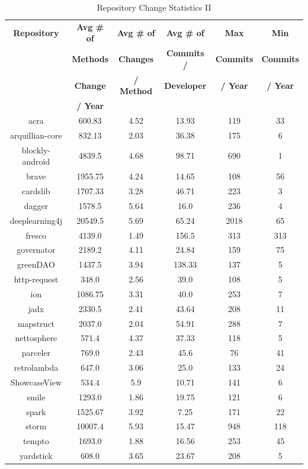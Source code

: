 \begin{table}
\begin{center}
    \begin{tabular}{|c|c|c|c|c|c|}
        \hline
        \textbf{Repository} & \textbf{Avg \# of} & \textbf{Avg \# of} & \textbf{Avg \# of} & \textbf{Max} & \textbf{Min} \\
         & \textbf{Methods} & \textbf{Changes} & \textbf{Commits /} & \textbf{Commits} & \textbf{Commits} \\
         & \textbf{Change} & \textbf{/ Method} & \textbf{Developer} & \textbf{/ Year} & \textbf{/ Year} \\
         & \textbf{/ Year} & & & & \\
        \hline
        acra & 600.83 & 4.52 & 13.93 & 119 & 33 \\
        arquillian-core & 832.13 & 2.03 & 36.38 & 175 & 6 \\
        blockly-android & 4839.5 & 4.68 & 98.71 & 690 & 1 \\
        brave & 1955.75 & 4.24 & 14.65 & 108 & 56 \\
        cardslib & 1707.33 & 3.28 & 46.71 & 223 & 3 \\
        dagger & 1578.5 & 5.64 & 16.0 & 236 & 4 \\
        deeplearning4j & 20549.5 & 5.69 & 65.24 & 2018 & 65 \\
        fresco & 4139.0 & 1.49 & 156.5 & 313 & 313 \\
        governator & 2189.2 & 4.11 & 24.84 & 159 & 75 \\
        greenDAO & 1437.5 & 3.94 & 138.33 & 137 & 5 \\
        http-request & 348.0 & 2.56 & 39.0 & 108 & 5 \\
        ion & 1086.75 & 3.31 & 40.0 & 253 & 7 \\
        jadx & 2330.5 & 2.41 & 43.64 & 208 & 11 \\
        mapstruct & 2037.0 & 2.04 & 54.91 & 288 & 7 \\
        nettosphere & 571.4 & 4.37 & 37.33 & 118 & 5 \\
        parceler & 769.0 & 2.43 & 45.6 & 76 & 41 \\
        retrolambda & 647.0 & 3.06 & 25.0 & 133 & 24 \\
        ShowcaseView & 534.4 & 5.9 & 10.71 & 141 & 6 \\
        smile & 1293.0 & 1.86 & 19.75 & 121 & 6 \\
        spark & 1525.67 & 3.92 & 7.25 & 171 & 22 \\
        storm & 10007.4 & 5.93 & 15.47 & 948 & 118 \\
        tempto & 1693.0 & 1.88 & 16.56 & 253 & 45 \\
        yardstick & 608.0 & 3.65 & 23.67 & 208 & 5 \\
        \hline
    \end{tabular}
\end{center}
\caption{Repository Change Statistics II}
\label{tab:repository_stats_2}
\end{table}

